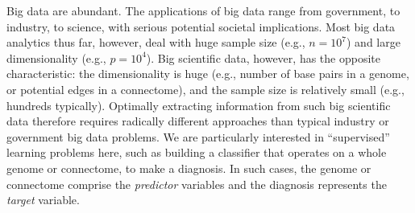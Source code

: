\documentclass[10pt]{article}
\begin{document}
%  	
%  






\lettrine[lines=3]{B}{}ig data are abundant.  The applications of big data range from government, to industry, to science, with serious potential societal implications. Most big data analytics thus far, however, deal with huge sample size (e.g., $n=10^7$) and large  dimensionality (e.g., $p=10^4$).  Big scientific data, however, has the opposite characteristic: the dimensionality is huge (e.g., number of base pairs in a genome, or potential edges in a connectome), and the sample size is relatively small (e.g., hundreds typically). Optimally extracting information from such big scientific data therefore requires radically different approaches than typical industry or government big data problems.  We are particularly interested in ``supervised'' learning problems here, such as building a classifier that operates on a whole genome or connectome, to make a diagnosis. In such cases, the genome or connectome comprise the \emph{predictor} variables and the diagnosis represents the \emph{target} variable.
\end{document}
